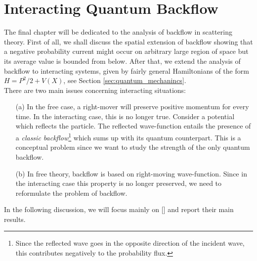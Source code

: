 \chapter{Interacting Quantum Backflow}
The final chapter will be dedicated to the analysis of backflow in scattering theory. First of all, we shall discuss the spatial extension of backflow showing that a negative probability current might occur on arbitrary large region of space but its average value is bounded from below. After that, we extend the analysis of backflow to interacting systems, given by fairly general Hamiltonians of the form $H = P^2/2 + V(X)$, see Section \ref{sec:quantum_mechanincs}.\\
There are two main issues concerning interacting situations:
\begin{itemize}
	\item[(a)] In the free case, a right-mover will preserve positive momentum for every time. In the interacting case, this is no longer true. Consider a potential which reflects the particle. The reflected wave-function entails the presence of a \textit{classic backflow}\footnote{Since the reflected wave goes in the opposite direction of the incident wave, this contributes negatively to the probability flux.} which sums up with its quantum counterpart. This is a conceptual problem since we want to study the strength of the only quantum backflow.
	\item[(b)] In free theory, backflow is based on right-moving wave-function. Since in the interacting case this property is no longer preserved, we need to reformulate the problem of backflow.
\end{itemize}
In the following discussion, we will focus mainly on [\citealp{gand}] and report their main results.

